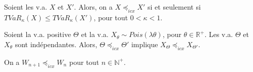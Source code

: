 \begin{proposition}{}{}
	Soient les v.a. $X$ et $X'$. Alors, on a $X\preceq_{icx} X'$ si et seulement si $TVaR_\kappa(X) \leq TVaR_\kappa(X')$, pour tout $0<\kappa<1$. 
\end{proposition}

\begin{proposition}{}{}
	Soient la v.a. positive $\Theta$ et la v.a. $X_\theta \sim Pois(\lambda \theta)$, pour $\theta \in \mathbb{R}^+$. Les v.a. $\Theta$ et $X_\theta$ sont indépendantes. Alors, $\Theta \preceq_{icx} \Theta'$ implique $X_\Theta \preceq_{icx} X_{\Theta'}$. 
\end{proposition}

\begin{proposition}{}{}
	On a $W_{n+1} \preceq_{icx} W_n$ pour tout $n\in \mathbb{N}^+$.
\end{proposition}



























